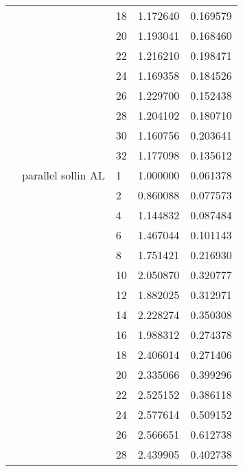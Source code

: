 \begin{tabular}{lllrr}
                      &                     & 18 &  1.172640 &  0.169579 \\
                      &                     & 20 &  1.193041 &  0.168460 \\
                      &                     & 22 &  1.216210 &  0.198471 \\
                      &                     & 24 &  1.169358 &  0.184526 \\
                      &                     & 26 &  1.229700 &  0.152438 \\
                      &                     & 28 &  1.204102 &  0.180710 \\
                      &                     & 30 &  1.160756 &  0.203641 \\
                      &                     & 32 &  1.177098 &  0.135612 \\
                      & parallel sollin AL & 1  &  1.000000 &  0.061378 \\
                      &                     & 2  &  0.860088 &  0.077573 \\
                      &                     & 4  &  1.144832 &  0.087484 \\
                      &                     & 6  &  1.467044 &  0.101143 \\
                      &                     & 8  &  1.751421 &  0.216930 \\
                      &                     & 10 &  2.050870 &  0.320777 \\
                      &                     & 12 &  1.882025 &  0.312971 \\
                      &                     & 14 &  2.228274 &  0.350308 \\
                      &                     & 16 &  1.988312 &  0.274378 \\
                      &                     & 18 &  2.406014 &  0.271406 \\
                      &                     & 20 &  2.335066 &  0.399296 \\
                      &                     & 22 &  2.525152 &  0.386118 \\
                      &                     & 24 &  2.577614 &  0.509152 \\
                      &                     & 26 &  2.566651 &  0.612738 \\
                      &                     & 28 &  2.439905 &  0.402738 \\

\end{tabular}
